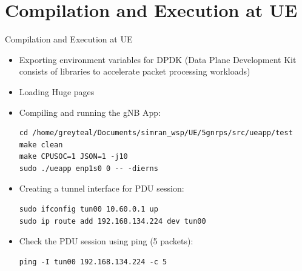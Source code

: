 \documentclass{beamer}
\begin{document}
\section{Compilation and Execution at UE}
\begin{frame}[fragile]{Compilation and Execution at UE}
\begin{itemize}
    	\item Exporting environment variables for DPDK (Data Plane Development Kit consists of libraries to accelerate packet processing workloads)
	\item Loading Huge pages
\item Compiling and running the gNB App:
\begin{lstlisting}
cd /home/greyteal/Documents/simran_wsp/UE/5gnrps/src/ueapp/test
make clean
make CPUSOC=1 JSON=1 -j10
sudo ./ueapp enp1s0 0 -- -dierns
\end{lstlisting}
\item Creating a tunnel interface for PDU session:
\begin{lstlisting}
sudo ifconfig tun00 10.60.0.1 up
sudo ip route add 192.168.134.224 dev tun00
\end{lstlisting}
\item Check the PDU session using ping (5 packets):
\begin{lstlisting}
ping -I tun00 192.168.134.224 -c 5
\end{lstlisting}
\end{itemize}
\end{frame}
\end{document}
